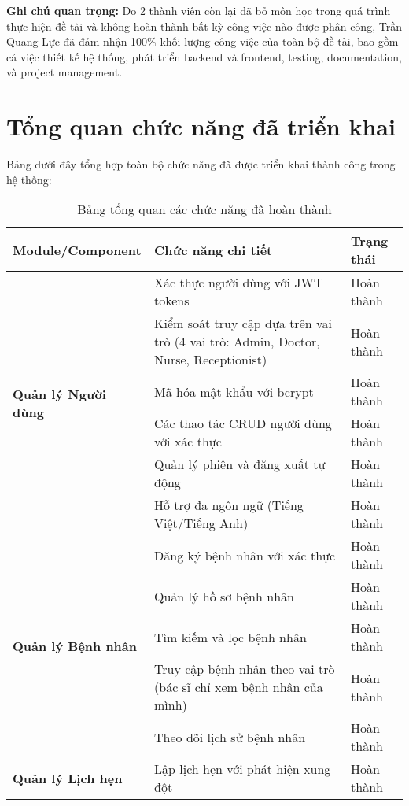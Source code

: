 \documentclass[12pt,a4paper]{report}
\begin{document}
    \textbf{Ghi chú quan trọng:} Do 2 thành viên còn lại đã bỏ môn học trong quá trình thực hiện đề tài và không hoàn thành bất kỳ công việc nào được phân công, Trần Quang Lực đã đảm nhận 100\% khối lượng công việc của toàn bộ đề tài, bao gồm cả việc thiết kế hệ thống, phát triển backend và frontend, testing, documentation, và project management.

    \section{Tổng quan chức năng đã triển khai}

    Bảng dưới đây tổng hợp toàn bộ chức năng đã được triển khai thành công trong hệ thống:

    \begin{table}[H]
    \centering
    \caption{Bảng tổng quan các chức năng đã hoàn thành}
    \begin{tabular}{|p{4cm}|p{8cm}|p{2.5cm}|}
    \hline
    \textbf{Module/Component} & \textbf{Chức năng chi tiết} & \textbf{Trạng thái} \\
    \hline
    \multirow{6}{4cm}{\textbf{Quản lý Người dùng}} & 
    Xác thực người dùng với JWT tokens & Hoàn thành \\
    \cline{2-3}
    & Kiểm soát truy cập dựa trên vai trò (4 vai trò: Admin, Doctor, Nurse, Receptionist) & Hoàn thành \\
    \cline{2-3}
    & Mã hóa mật khẩu với bcrypt & Hoàn thành \\
    \cline{2-3}
    & Các thao tác CRUD người dùng với xác thực & Hoàn thành \\
    \cline{2-3}
    & Quản lý phiên và đăng xuất tự động & Hoàn thành \\
    \cline{2-3}
    & Hỗ trợ đa ngôn ngữ (Tiếng Việt/Tiếng Anh) & Hoàn thành \\
    \hline
    \multirow{5}{4cm}{\textbf{Quản lý Bệnh nhân}} & Đăng ký bệnh nhân với xác thực & Hoàn thành \\
    \cline{2-3}
    & Quản lý hồ sơ bệnh nhân & Hoàn thành \\
    \cline{2-3}
    & Tìm kiếm và lọc bệnh nhân & Hoàn thành \\
    \cline{2-3}
    & Truy cập bệnh nhân theo vai trò (bác sĩ chỉ xem bệnh nhân của mình) & Hoàn thành \\
    \cline{2-3}
    & Theo dõi lịch sử bệnh nhân & Hoàn thành \\
    \hline
    \multirow{5}{4cm}{\textbf{Quản lý Lịch hẹn}} & Lập lịch hẹn với phát hiện xung đột & Hoàn thành \\

\end{tabular}
\end{table}
\end{document}
